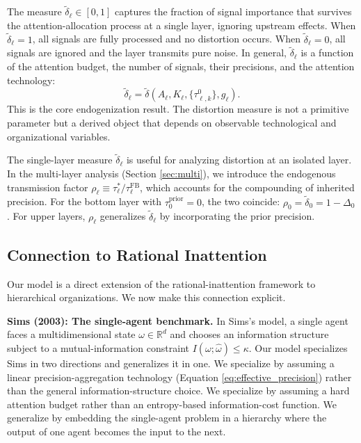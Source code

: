 The measure $\tilde{\delta}_\ell \in [0,1]$ captures the fraction of signal importance that survives the attention-allocation process at a single layer, ignoring upstream effects. When $\tilde{\delta}_\ell = 1$, all signals are fully processed and no distortion occurs. When $\tilde{\delta}_\ell = 0$, all signals are ignored and the layer transmits pure noise. In general, $\tilde{\delta}_\ell$ is a function of the attention budget, the number of signals, their precisions, and the attention technology:
\begin{equation}\label{eq:delta_function}
\tilde{\delta}_\ell = \tilde{\delta}(A_\ell, K_\ell, \{\tau^0_{\ell,k}\}, g_\ell).
\end{equation}
This is the core endogenization result. The distortion measure is not a primitive parameter but a derived object that depends on observable technological and organizational variables.

\begin{remark}\label{rem:delta_to_rho}
The single-layer measure $\tilde{\delta}_\ell$ is useful for analyzing distortion at an isolated layer. In the multi-layer analysis (Section \ref{sec:multi}), we introduce the endogenous transmission factor $\rho_\ell \equiv \tau^*_\ell / \tau^{\text{FB}}_\ell$, which accounts for the compounding of inherited precision. For the bottom layer with $\tau^{\text{prior}}_0 = 0$, the two coincide: $\rho_0 = \tilde{\delta}_0 = 1 - \Delta_0$. For upper layers, $\rho_\ell$ generalizes $\tilde{\delta}_\ell$ by incorporating the prior precision.
\end{remark}

\subsection{Connection to Rational Inattention}
\label{subsec:ri_connection}

Our model is a direct extension of the rational-inattention framework to hierarchical organizations. We now make this connection explicit.

\textbf{Sims (2003): The single-agent benchmark.} In Sims's model, a single agent faces a multidimensional state $\omega \in \mathbb{R}^d$ and chooses an information structure subject to a mutual-information constraint $I(\omega; \hat{\omega}) \leq \kappa$. Our model specializes Sims in two directions and generalizes it in one. We specialize by assuming a linear precision-aggregation technology (Equation \eqref{eq:effective_precision}) rather than the general information-structure choice. We specialize by assuming a hard attention budget rather than an entropy-based information-cost function. We generalize by embedding the single-agent problem in a hierarchy where the output of one agent becomes the input to the next.

